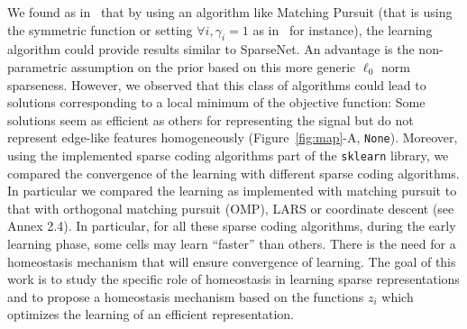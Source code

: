 \documentclass[draft]{article} %
\newcommand{\seeFig}[1]{Figure~\ref{fig:#1}}%
\begin{document}
We found as in~\citep{Rehn07} that by using an algorithm like Matching Pursuit (that is using the symmetric function or setting $\forall i, \gamma_i=1$ as in~\citep{Mairal14} for instance), the learning algorithm could provide results similar to {\sc SparseNet}. An advantage is the non-parametric assumption on the prior based on this more generic $\ell_0$ norm sparseness. However, we observed that this class of algorithms could lead to solutions corresponding to a local minimum of the objective function: Some solutions seem as efficient as others for representing the signal but do not represent edge-like features homogeneously (\seeFig{map}-A, \texttt{None}). %
Moreover, using the implemented sparse coding algorithms part of the \verb+sklearn+ library, we compared the convergence of the learning with different sparse coding algorithms. In particular we compared the learning as implemented with matching pursuit to that with orthogonal matching pursuit (OMP), LARS or coordinate descent (see Annex 2.4).
In particular, for all these sparse coding algorithms, during the early learning phase, some cells may learn ``faster'' than others. There is the need for a homeostasis mechanism that will ensure convergence of learning. The goal of this work is to study the specific role of homeostasis in learning sparse representations and to propose a homeostasis mechanism based on the functions $z_i$ which optimizes the learning of an efficient representation.%
\end{document}
